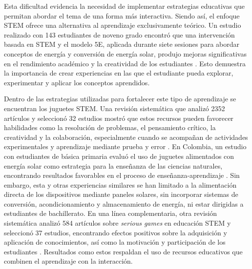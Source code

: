 \documentclass[11pt]{article}
\begin{document}
Esta dificultad evidencia la necesidad de implementar estrategias educativas que permitan abordar el tema de una forma más interactiva. Siendo así, el enfoque STEM ofrece una alternativa al aprendizaje exclusivamente teórico. Un estudio realizado con 143 estudiantes de noveno grado encontró que una intervención basada en STEM y el modelo 5E, aplicada durante siete sesiones para abordar conceptos de energía y conversión de energía solar, produjo mejoras significativas en el rendimiento académico y la creatividad de los estudiantes \cite{Shahbazloo2023}. Esto demuestra la importancia de crear experiencias en las que el estudiante pueda explorar, experimentar y aplicar los conceptos aprendidos.

Dentro de las estrategias utilizadas para fortalecer este tipo de aprendizaje se encuentran los juguetes STEM. Una revisión sistemática que analizó 2352 artículos y seleccionó 32 estudios mostró que estos recursos pueden favorecer habilidades como la resolución de problemas, el pensamiento crítico, la creatividad y la colaboración, especialmente cuando se acompañan de actividades experimentales y aprendizaje mediante prueba y error \cite{Pandey2025}. En Colombia, un estudio con estudiantes de básica primaria evaluó el uso de juguetes alimentados con energía solar como estrategia para la enseñanza de las ciencias naturales, encontrando resultados favorables en el proceso de enseñanza-aprendizaje \cite{MendozaMendoza2025}. Sin embargo, esta y otras experiencias similares se han limitado a la alimentación directa de los dispositivos mediante paneles solares, sin incorporar sistemas de conversión, acondicionamiento y almacenamiento de energía, ni estar dirigidas a estudiantes de bachillerato. En una línea complementaria, otra revisión sistemática analizó 584 artículos sobre \textit{serious games} en educación STEM y seleccionó 37 estudios, encontrando efectos positivos sobre la adquisición y aplicación de conocimientos, así como la motivación y participación de los estudiantes \cite{Tene2025}. Resultados como estos respaldan el uso de recursos educativos que combinen el aprendizaje con la interacción.
\end{document}

